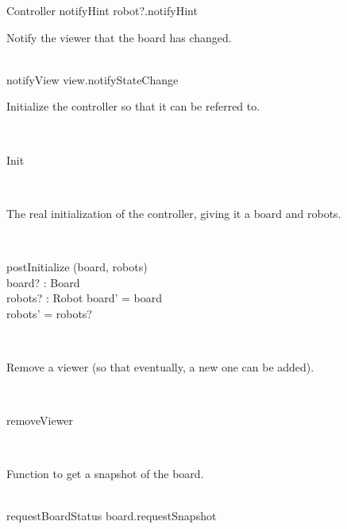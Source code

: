 \begin{class}{Controller}
notifyHint \sdef robot?.notifyHint \\
\begin{classcom}
Notify the viewer that the board has changed.
\end{classcom} \\
notifyView \sdef view.notifyStateChange
\znewpage
\begin{classcom}
Initialize the controller so that it can be referred to.
\end{classcom} \\
\begin{schema}{Init}
\end{schema}\\
\begin{classcom}
The real initialization of the controller, giving it a board and robots.
\end{classcom} \\
\begin{schema}{postInitialize}
\Delta (board, robots) \\
board? : Board \\
robots? : \power Robot
\where
board' = board \\
robots' = robots?
\end{schema}\\
\begin{classcom}
Remove a viewer (so that eventually, a new one can be added).
\end{classcom} \\
\begin{schema}{removeViewer}
\end{schema}\\
\begin{classcom}
Function to get a snapshot of the board.
\end{classcom} \\
requestBoardStatus \sdef board.requestSnapshot
\end{class}